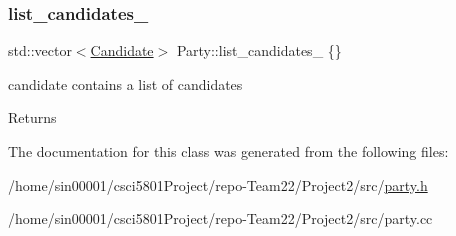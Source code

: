 \subsubsection{\texorpdfstring{list\+\_\+candidates\+\_\+}{list\_candidates\_}}
{\footnotesize\ttfamily std\+::vector$<$\hyperlink{classCandidate}{Candidate}$>$ Party\+::list\+\_\+candidates\+\_\+ \{\}}



candidate contains a list of candidates 

\begin{DoxyReturn}{Returns}

\end{DoxyReturn}


The documentation for this class was generated from the following files\+:\begin{DoxyCompactItemize}
\item 
/home/sin00001/csci5801\+Project/repo-\/\+Team22/\+Project2/src/\hyperlink{party_8h}{party.\+h}\item 
/home/sin00001/csci5801\+Project/repo-\/\+Team22/\+Project2/src/party.\+cc\end{DoxyCompactItemize}
